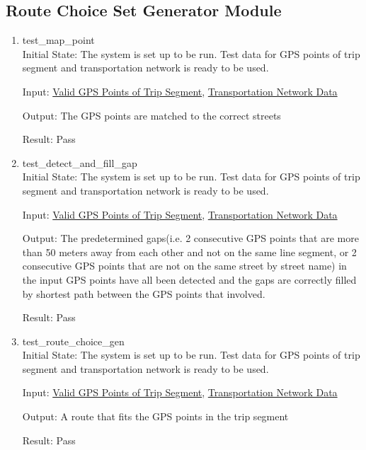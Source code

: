 \documentclass[12pt, titlepage]{article}
\begin{document}
\subsection{Route Choice Set Generator Module}
\begin{enumerate}
    \item{test\_map\_point} \label{test_map_point}\\
    Initial State: The system is set up to be run. Test data for GPS points of trip segment and transportation network is ready to be used.

    Input: \href{https://github.com/paezha/PyERT-BLACK/tree/rev0-test/test/test_data/test_rs_trip_seg}{Valid GPS Points of Trip Segment}, \href{https://github.com/paezha/PyERT-BLACK/tree/rev0-test/test/test_data/test_rs_network_g.osm}{Transportation Network Data}

    Output: The GPS points are matched to the correct streets

    Result: Pass

    \item{test\_detect\_and\_fill\_gap} \label{test_detect_and_fill_gap}\\
    Initial State: The system is set up to be run. Test data for GPS points of trip segment and transportation network is ready to be used.

    Input: \href{https://github.com/paezha/PyERT-BLACK/tree/rev0-test/test/test_data/test_rs_trip_seg}{Valid GPS Points of Trip Segment}, \href{https://github.com/paezha/PyERT-BLACK/tree/rev0-test/test/test_data/test_rs_network_g.osm}{Transportation Network Data}

    Output: The predetermined gaps(i.e. 2 consecutive GPS points that are more than 50 meters away from each other and not on the same line segment, or 2 consecutive GPS points that are not on the same street by street name) in the input GPS points have all been detected and the gaps are correctly filled by shortest path between the GPS points that involved.

    Result: Pass

    \item{test\_route\_choice\_gen} \label{test_route_choice_gen}\\
    Initial State: The system is set up to be run. Test data for GPS points of trip segment and transportation network is ready to be used.

    Input: \href{https://github.com/paezha/PyERT-BLACK/tree/rev0-test/test/test_data/test_rs_trip_seg}{Valid GPS Points of Trip Segment}, \href{https://github.com/paezha/PyERT-BLACK/tree/rev0-test/test/test_data/test_rs_network_g.osm}{Transportation Network Data}

    Output: A route that fits the GPS points in the trip segment 

    Result: Pass
    
\end{enumerate}
\end{document}
